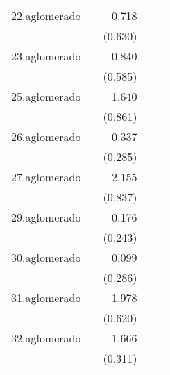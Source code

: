 {\begin{longtable}{l*{4}{D{.}{.}{-1}}}
\addlinespace
22.aglomerado&                     &       0.718         &                     &                     \\
            &                     &     (0.630)         &                     &                     \\
\addlinespace
23.aglomerado&                     &       0.840         &                     &                     \\
            &                     &     (0.585)         &                     &                     \\
\addlinespace
25.aglomerado&                     &       1.640         &                     &                     \\
            &                     &     (0.861)         &                     &                     \\
\addlinespace
26.aglomerado&                     &       0.337         &                     &                     \\
            &                     &     (0.285)         &                     &                     \\
\addlinespace
27.aglomerado&                     &       2.155\sym{*}  &                     &                     \\
            &                     &     (0.837)         &                     &                     \\
\addlinespace
29.aglomerado&                     &      -0.176         &                     &                     \\
            &                     &     (0.243)         &                     &                     \\
\addlinespace
30.aglomerado&                     &       0.099         &                     &                     \\
            &                     &     (0.286)         &                     &                     \\
\addlinespace
31.aglomerado&                     &       1.978\sym{**} &                     &                     \\
            &                     &     (0.620)         &                     &                     \\
\addlinespace
32.aglomerado&                     &       1.666\sym{***}&                     &                     \\
            &                     &     (0.311)         &                     &                     \\

\end{longtable}}
